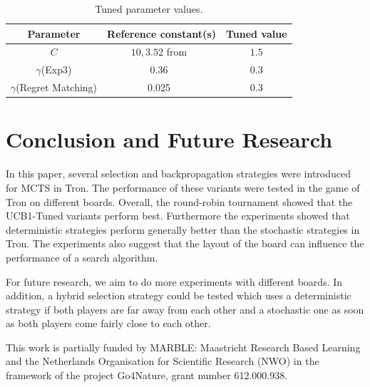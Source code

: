\documentclass{article}
\begin{document}
\begin{table}
\begin{minipage}{.4\textwidth}
\begin{tabular}{|c||c|c|}
							\hline
Parameter			& Reference constant(s)                             & Tuned value	\\ \hline\hline
    $C$				& $10,3.52$ from~\cite{teuling_tron,cig_paper}	& $1.5$		\\ \hline
$\gamma$(Exp3) & 0.36~\cite{cig_paper}		& 0.3		\\ \hline
$\gamma$(Regret Matching)	& 0.025~\cite{mcts_goofspiel}				& 0.3		\\ \hline
\end{tabular}
\caption{Tuned parameter values. \label{tbl:tunedvals} }
\end{minipage}
\end{table}

\section{Conclusion and Future Research}
\label{sec:conclusion}

In this paper, several selection and backpropagation strategies were introduced for MCTS in Tron.
The performance of these variants were tested in the game of Tron on different boards.
Overall, the round-robin tournament showed that the UCB1-Tuned variants perform best. %
Furthermore the experiments showed that deterministic strategies perform generally better than the stochastic strategies in Tron.
The experiments also suggest that the layout of the board can influence the performance of a search algorithm.

For future research, we aim to do more experiments with different boards. 
In addition, a hybrid selection strategy could be tested which uses a deterministic strategy if both players are far away from each other and a stochastic one as soon as both players come fairly close to each other. 

\vspace{0.2cm}
 {\small This work is partially funded by MARBLE: Maastricht
Research Based Learning and the Netherlands Organisation
for Scientific Research (NWO) in the framework of the project
Go4Nature, grant number 612.000.938. }

\vspace{-0.5cm}


\end{document}

